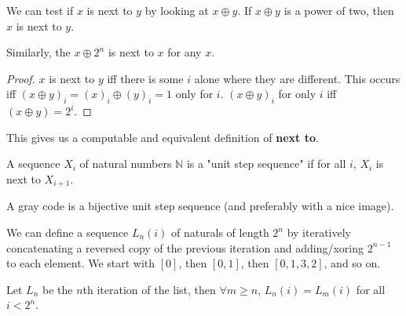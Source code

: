 \begin{theorem}
    \label{thm:next_to_xor_two_pow}
    \leanok
    We can test if $x$ is next to $y$ by looking at $x \oplus y$. If $x \oplus y$ is a
    power of two, then $x$ is next to $y$.

    Similarly, the $x \oplus 2^n$ is next to $x$ for any $x$.
\end{theorem}

\begin{proof}
    \leanok
    $x$ is next to $y$ iff there is some $i$ alone where they are different.
    This occurs iff $(x \oplus y)_i = (x)_i \oplus (y)_i = 1$ only for $i$.
    $(x \oplus y)_i$ for only $i$ iff $(x \oplus y) = 2^i$.
\end{proof}

\begin{definition}
    \label{def:computable_next_to}
    \leanok

    This gives us a computable and equivalent definition of \textbf{next to}.
\end{definition}

\begin{definition}
    \label{def:unit_step_sequence}
    \leanok
    A sequence $X_i$ of natural numbers $\mathbb{N}$ is a "unit step sequence" if
    for all $i$, $X_i$ is next to $X_{i+1}$.
\end{definition}

\begin{definition}
    \label{def:gray_code}
    \leanok

    A gray code is a bijective unit step sequence (and preferably with a nice image).
\end{definition}

\begin{definition}
    \label{def:list_gray_code}
    \leanok

    We can define a sequence $L_n(i)$ of naturals of length $2^n$ by iteratively concatenating
    a reversed copy of the previous iteration and adding/xoring $2^{n-1}$ to each element.
    We start with $[0]$, then $[0, 1]$, then $[0, 1, 3, 2]$, and so on.
\end{definition}

\begin{theorem}
    \label{thm:list_is_stable}
    \leanok

    Let $L_n$ be the $n$th iteration of the list, then $\forall m \ge n$, $L_n(i) = L_m(i)$ for all $i < 2^n$.
\end{theorem}

